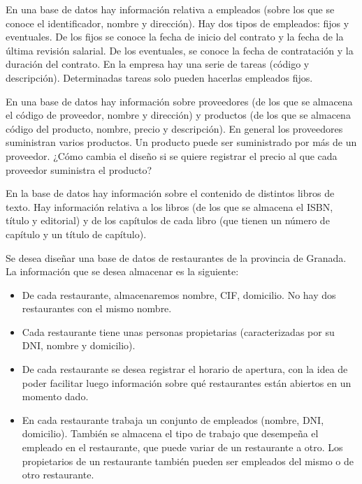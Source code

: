 \begin{ejercicio} \label{ej:15}
    En una base de datos hay información relativa a empleados (sobre los que se conoce el identificador, nombre
    y dirección). Hay dos tipos de empleados: fijos y eventuales. De los fijos se conoce la fecha de inicio del
    contrato y la fecha de la última revisión salarial. De los eventuales, se conoce la fecha de contratación y la
    duración del contrato. En la empresa hay una serie de tareas (código y descripción). Determinadas tareas
    solo pueden hacerlas empleados fijos.
\end{ejercicio}

\begin{ejercicio} \label{ej:16}
    En una base de datos hay información sobre proveedores (de los que se almacena el código de proveedor,
    nombre y dirección) y productos (de los que se almacena código del producto, nombre, precio y descripción).
    En general los proveedores suministran varios productos. Un producto puede ser suministrado por más de un
    proveedor. ¿Cómo cambia el diseño si se quiere registrar el precio al que cada proveedor suministra el
    producto?
\end{ejercicio}


\begin{ejercicio} \label{ej:17}
    En la base de datos hay información sobre el contenido de distintos libros de texto. Hay información relativa
    a los libros (de los que se almacena el ISBN, título y editorial) y de los capítulos de cada libro (que tienen un
    número de capítulo y un título de capítulo).
\end{ejercicio}

\begin{ejercicio} \label{ej:18}
    Se desea diseñar una base de datos de restaurantes de la provincia de Granada. La información que se desea
    almacenar es la siguiente:
    \begin{itemize}
        \item De cada restaurante, almacenaremos nombre, CIF, domicilio. No hay dos restaurantes con el mismo
        nombre.
        \item Cada restaurante tiene unas personas propietarias (caracterizadas por su DNI, nombre y domicilio).
        \item De cada restaurante se desea registrar el horario de apertura, con la idea de poder facilitar luego
        información sobre qué restaurantes están abiertos en un momento dado.
        \item En cada restaurante trabaja un conjunto de empleados (nombre, DNI, domicilio). También se
        almacena el tipo de trabajo que desempeña el empleado en el restaurante, que puede variar de un
        restaurante a otro. Los propietarios de un restaurante también pueden ser empleados del mismo o
        de otro restaurante.
    \end{itemize}
\end{ejercicio}

